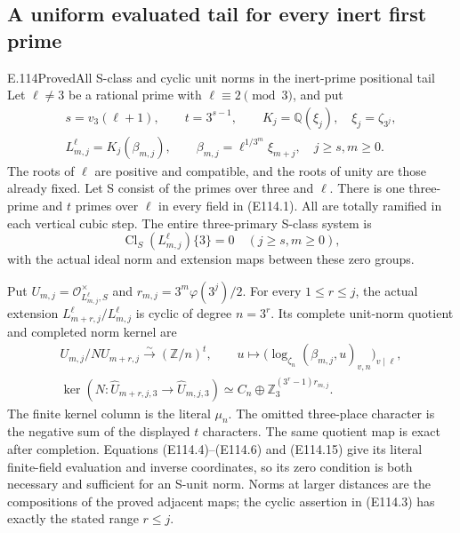 \subsection{A uniform evaluated tail for every inert first prime}

\begin{statement}{E.114}{Proved}{All S-class and cyclic unit norms in the inert-prime positional tail}
Let $\ell\ne3$ be a rational prime with $\ell\equiv2\pmod3$,
and put
\[
 \begin{gathered}
 s=v_3(\ell+1),\qquad t=3^{s-1},\qquad
 K_j=\mathbb Q(\xi_j),\quad \xi_j=\zeta_{3^j},\\
 L^{\ell}_{m,j}=K_j(\beta_{m,j}),\qquad
 \beta_{m,j}=\ell^{1/3^m}\xi_{m+j},\quad j\ge s, m\ge0.
 \end{gathered}
 \tag{E114.1}
\]
The roots of $\ell$ are positive and compatible, and the
roots of unity are those already fixed. Let S consist of
the primes over three and $\ell$. There is one three-prime
and $t$ primes over $\ell$ in every field in (E114.1).
All are totally ramified in each vertical cubic step.
The entire three-primary S-class system is
\[
           \operatorname{Cl}_S(L^{\ell}_{m,j})\{3\}=0
                    \quad(j\ge s, m\ge0),
 \tag{E114.2}
\]
with the actual ideal norm and extension maps between
these zero groups.

Put $U_{m,j}=\mathcal O_{L^{\ell}_{m,j},S}^{\times}$ and
$r_{m,j}=3^m\varphi(3^j)/2$. For every $1\le r\le j$,
the actual extension $L^{\ell}_{m+r,j}/L^{\ell}_{m,j}$
is cyclic of degree $n=3^r$. Its complete unit-norm
quotient and completed norm kernel are
\[
 \begin{gathered}
 U_{m,j}/N U_{m+r,j}\xrightarrow{\sim}(\mathbb Z/n)^t,
 \qquad u\longmapsto
   \bigl(\log_{\zeta_n}(\beta_{m,j},u)_{v,n}\bigr)_{v\mid\ell},\\
 \ker(N:\widehat U_{m+r,j,3}\longrightarrow
                          \widehat U_{m,j,3})
       \simeq C_n\oplus\mathbb Z_3^{(3^r-1)r_{m,j}}.
 \end{gathered}
 \tag{E114.3}
\]
The finite kernel column is the literal $\mu_n$.
The omitted three-place character is the negative sum
of the displayed $t$ characters. The same quotient map
is exact after completion. Equations (E114.4)--(E114.6)
and (E114.15) give its literal finite-field evaluation and inverse
coordinates, so its zero condition is both necessary
and sufficient for an S-unit norm.
Norms at larger distances are the compositions of the
proved adjacent maps; the cyclic assertion in (E114.3)
has exactly the stated range $r\le j$.


\end{statement}
